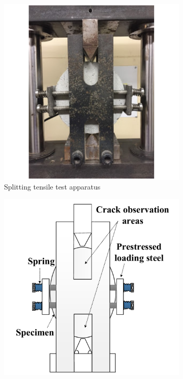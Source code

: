 \documentclass[11pt]{article}
\begin{document}
	
		\begin{figure}[!h]
		\centering
		\begin{subfigure}{0.31\textwidth}
			\centering
			\includegraphics[width = \linewidth]{CR2}
			\caption{Splitting tensile test apparatus}
		\end{subfigure}
	\hspace{-0.1em}
		\begin{subfigure}{0.31\textwidth}
		\centering
		\includegraphics[width = \linewidth]{CR1}

\end{subfigure}
\end{figure}
\end{document}
